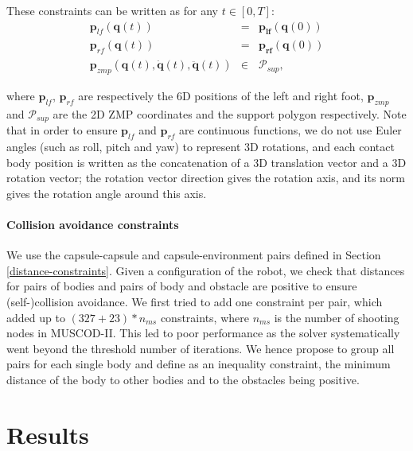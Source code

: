 These constraints can be written as for any $t\in[0,T]$:
\begin{equation}
  \begin{array}{rcl}
    \mathbf{p}_{lf}(\mathbf{q}(t)) & = & \mathbf{p_{lf}}(\mathbf{q}(0)) \\
    \mathbf{p}_{rf}(\mathbf{q}(t)) & = & \mathbf{p_{rf}}(\mathbf{q}(0)) \\
    \mathbf{p}_{zmp} (\mathbf{q}(t), \mathbf{\dot{q}}(t), \mathbf{\ddot{q}}(t)) & \in & \mathcal{P}_{sup},
  \end{array}
  \label{dynamic-constraints}
\end{equation}

where $\mathbf{p}_{lf}$, $\mathbf{p}_{rf}$ are respectively the 6D
positions of the left and right foot, $\mathbf{p}_{zmp}$ and
$\mathcal{P}_{sup}$ are the 2D ZMP coordinates and the support polygon
respectively. Note that in order to ensure $\mathbf{p}_{lf}$ and
$\mathbf{p}_{rf}$ are continuous functions, we do not use Euler angles
(such as roll, pitch and yaw) to represent 3D rotations, and each
contact body position is written as the concatenation of a 3D
translation vector and a 3D rotation vector; the rotation vector
direction gives the rotation axis, and its norm gives the rotation
angle around this axis.

\paragraph{Collision avoidance constraints}
We use the capsule-capsule and capsule-environment pairs defined in
Section \ref{distance-constraints}. Given a configuration \config{} of
the robot, we check that distances for pairs of bodies and pairs of
body and obstacle are positive to ensure (self-)collision
avoidance. We first tried to add one constraint per pair, which added
up to $(327 + 23)*n_{ms}$ constraints, where $n_{ms}$ is the number of
shooting nodes in \textsc{MUSCOD-II}. This led to poor performance as
the solver systematically went beyond the threshold number of
iterations. We hence propose to group all pairs for each single body
and define as an inequality constraint, the minimum distance of the
body to other bodies and to the obstacles being positive.

\section{Results}
\label{results}

